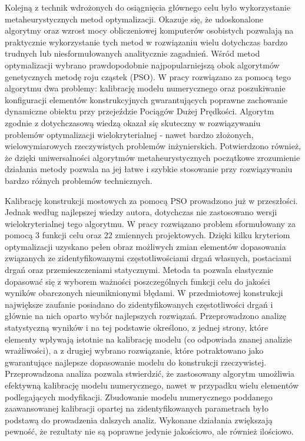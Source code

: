 Kolejną z technik wdrożonych do osiągnięcia głównego celu było wykorzystanie metaheurystycznych metod optymalizacji. Okazuje się, że udoskonalone algorytmy oraz wzrost mocy obliczeniowej komputerów osobistych pozwalają na praktycznie wykorzystanie tych metod w rozwiązaniu wielu dotychczas bardzo trudnych lub niesformułowanych analitycznie zagadnień. Wśród metod optymalizacji wybrano prawdopodobnie najpopularniejszą obok algorytmów genetycznych metodę roju cząstek (PSO). W pracy rozwiązano za pomocą tego algorytmu dwa problemy: kalibrację modelu numerycznego oraz poszukiwanie konfiguracji elementów konstrukcyjnych gwarantujących poprawne zachowanie dynamiczne obiektu przy przejeździe Pociągów Dużej Prędkości. Algorytm zgodnie z dotychczasową wiedzą okazał się skuteczny w rozwiązywaniu problemów optymalizacji wielokryterialnej - nawet bardzo złożonych, wielowymiarowych rzeczywistych problemów inżynierskich. Potwierdzono również, że dzięki uniwersalności algorytmów metaheurystycznych początkowe zrozumienie działania metody pozwala na jej łatwe i szybkie stosowanie przy rozwiązywaniu bardzo różnych problemów technicznych. 

Kalibrację konstrukcji mostowych za pomocą PSO prowadzono już w przeszłości. Jednak według najlepszej wiedzy autora, dotychczas nie zastosowano wersji wielokryterialnej tego algorytmu. W pracy rozwiązano problem sformułowany za pomocą 3 funkcji celu oraz 22 zmiennych projektowych. Dzięki kilku kryteriom optymalizacji uzyskano pełen obraz możliwych zmian elementów dopasowania związanych ze zidentyfikowanymi częstotliwościami drgań własnych, postaciami drgań oraz przemieszczeniami statycznymi. Metoda ta pozwala elastycznie dopasować się z wyborem ważności poszczególnych funkcji celu do jakości wyników obarczonych nieuniknionymi błędami. W przedmiotowej konstrukcji największe zaufanie posiadano do zidentyfikowanych częstotliwości drgań i głównie na nich oparto wybór najlepszych rozwiązań. Przeprowadzono analizę statystyczną wyników i na tej podstawie określono, z jednej strony, które elementy wpływają istotnie na kalibrację modelu (co odpowiada znanej analizie wrażliwości), a z drugiej wybrano rozwiązanie, które potraktowano jako gwarantujące najlepsze dopasowanie modelu do konstrukcji rzeczywistej. Przeprowadzona analiza pozwala stwierdzić, że zastosowany algorytm umożliwia efektywną kalibrację modelu numerycznego, nawet w przypadku wielu elementów podlegających modyfikacji. Zbudowanie modelu numerycznego poddanego zaawansowanej kalibracji opartej na zidentyfikowanych parametrach było podstawą do prowadzenia dalszych analiz. Wykonane działania zwiększają pewność, że rezultaty nie są poprawne jedynie jakościowo, ale również ilościowo. 

